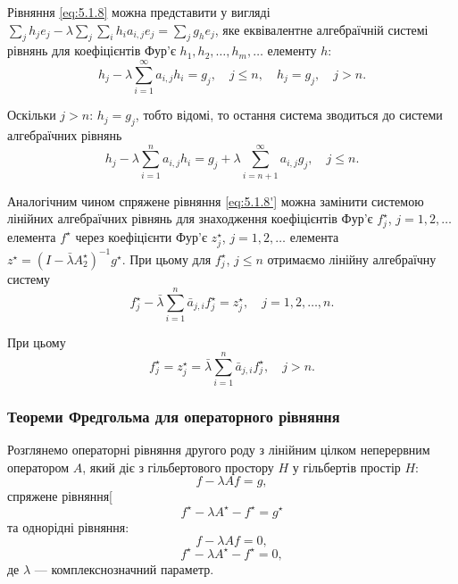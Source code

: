 Рівняння \eqref{eq:5.1.8} можна представити у вигляді $\sum_j h_j e_j - \lambda \sum_j \sum_i h_i a_{i, j} e_j = \sum_j g_h e_j$, яке еквівалентне алгебраїчній системі рівнянь для коефіцієнтів Фур'є $h_1, h_2, \ldots, h_m, \ldots$ елементу $h$:
\begin{equation*}
    h_j - \lambda \sum_{i = 1}^\infty a_{i, j} h_i = g_j, \quad j \le n, \quad h_j = g_j, \quad j > n.
\end{equation*}

Оскільки $j > n$: $h_j = g_j$, тобто відомі, то остання система зводиться до системи алгебраїчних рівнянь
\begin{equation}
    \label{eq:5.1.9}
    h_j - \lambda \sum_{i = 1}^n a_{i, j} h_i = g_j + \lambda \sum_{i = n + 1}^\infty a_{i, j} g_j, \quad j \le n.
\end{equation}

Аналогічним чином спряжене рівняння \eqref{eq:5.1.8'} можна замінити системою лінійних алгебраїчних рівнянь для знаходження коефіцієнтів Фур'є $f_j^\star$, $j = 1, 2, \ldots$ елемента $f^\star$ через коефіцієнти Фур'є $z_j^\star$, $j = 1, 2, \ldots$ елемента $z^\star = (I - \bar \lambda A_2^\star)^{-1} g^\star$. При цьому для $f_j^\star$, $j \le n$ отримаємо лінійну алгебраїчну систему
\begin{equation}
    \label{eq:5.1.9'}
    f_j^\star - \bar \lambda \sum_{i = 1}^n \bar a_{j, i} f_j^\star = z_j^\star, \quad j = 1, 2, \ldots, n.
\end{equation}

При цьому
\begin{equation}
    \label{eq:5.1.10}
    f_j^\star = z_j^\star = \bar \lambda \sum_{i = 1}^n \bar a_{j, i} f_j^\star, \quad j > n.
\end{equation}

\subsubsection{Теореми Фредгольма для операторного рівняння}

Розглянемо операторні рівняння другого роду з лінійним цілком неперервним оператором $A$, який діє з гільбертового простору $H$ у гільбертів простір $H$:
\begin{equation}
    \label{eq:5.1.11}
    f - \lambda A f = g,
\end{equation}
спряжене рівняння[
\begin{equation}
    \label{eq:5.1.12}
    f^\star - \lambda A^\star - f^\star = g^\star
\end{equation}
та однорідні рівняння:
\begin{equation}
    \label{eq:5.1.11'}
    f - \lambda A f = 0,
\end{equation}
\begin{equation}
    \label{eq:5.1.12'}
    f^\star - \lambda A^\star - f^\star = 0,
\end{equation}
де $\lambda$ --- комплекснозначний параметр. \medskip

